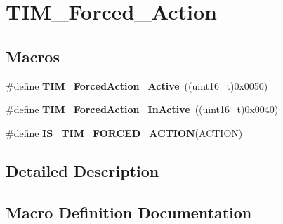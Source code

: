 \hypertarget{group___t_i_m___forced___action}{}\section{T\+I\+M\+\_\+\+Forced\+\_\+\+Action}
\label{group___t_i_m___forced___action}
\subsection*{Macros}
\begin{DoxyCompactItemize}
\item 
\#define {\bfseries T\+I\+M\+\_\+\+Forced\+Action\+\_\+\+Active}~((uint16\+\_\+t)0x0050)\hypertarget{group___t_i_m___forced___action_ga19d3769825f1dfdbdbde3edb60310b99}{}\label{group___t_i_m___forced___action_ga19d3769825f1dfdbdbde3edb60310b99}

\item 
\#define {\bfseries T\+I\+M\+\_\+\+Forced\+Action\+\_\+\+In\+Active}~((uint16\+\_\+t)0x0040)\hypertarget{group___t_i_m___forced___action_ga79656f2193ec5e12a15d0ae5b025d273}{}\label{group___t_i_m___forced___action_ga79656f2193ec5e12a15d0ae5b025d273}

\item 
\#define {\bfseries I\+S\+\_\+\+T\+I\+M\+\_\+\+F\+O\+R\+C\+E\+D\+\_\+\+A\+C\+T\+I\+ON}(A\+C\+T\+I\+ON)
\end{DoxyCompactItemize}


\subsection{Detailed Description}


\subsection{Macro Definition Documentation}

